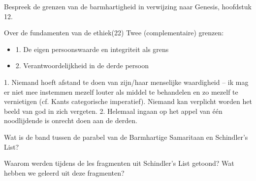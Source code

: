 \documentclass[main.tex]{subfiles}
\begin{document}
\begin{examenvraag}
    \begin{vraag}
        Bespreek de grenzen van de barmhartigheid in verwijzing naar Genesis, hoofdstuk 12.
    \end{vraag}

    \begin{antwoord}
        \begin{citaat}{Over de fundamenten van de ethiek(22)}
            Twee (complementaire) grenzen:
            \begin{itemize}
                \item 1. De eigen persoonswaarde en integriteit als grens
                \item 2. Verantwoordelijkheid in de derde persoon
            \end{itemize}
        \end{citaat}

        1. Niemand hoeft afstand te doen van zijn/haar menselijke waardigheid – ik mag er niet
        mee instemmen mezelf louter als middel te behandelen en zo mezelf te vernietigen (cf. Kants categorische imperatief).
        Niemand kan verplicht worden het beeld van god in zich vergeten.
        2. Helemaal ingaan op het appel van \'{e}\'{e}n noodlijdende is onrecht doen aan de derden.


    \end{antwoord}
\end{examenvraag}


\begin{examenvraag}
    \begin{vraag}
        Wat is de band tussen de parabel van de Barmhartige Samaritaan en Schindler’s List?
    \end{vraag}

    \begin{antwoord}
    \end{antwoord}
\end{examenvraag}


\begin{examenvraag}
    \begin{vraag}
        Waarom werden tijdens de les fragmenten uit Schindler’s List getoond? Wat hebben we geleerd uit deze fragmenten?
    \end{vraag}

    \begin{antwoord}
    \end{antwoord}
\end{examenvraag}
\end{document}
